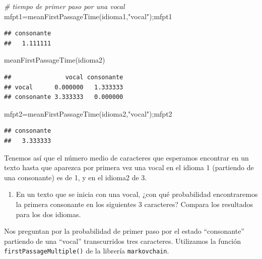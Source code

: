 \documentclass[
]{book}
\newenvironment{Shaded}{\begin{snugshade}}{\end{snugshade}}
\newcommand{\CommentTok}[1]{\textcolor[rgb]{0.56,0.35,0.01}{\textit{#1}}}
\newcommand{\FunctionTok}[1]{\textcolor[rgb]{0.00,0.00,0.00}{#1}}
\newcommand{\NormalTok}[1]{#1}
\newcommand{\OtherTok}[1]{\textcolor[rgb]{0.56,0.35,0.01}{#1}}
\newcommand{\StringTok}[1]{\textcolor[rgb]{0.31,0.60,0.02}{#1}}
\providecommand{\tightlist}{%
  \setlength{\itemsep}{0pt}\setlength{\parskip}{0pt}}
\theoremstyle{definition}
\theoremstyle{definition}
\theoremstyle{definition}
\theoremstyle{definition}
\theoremstyle{remark}
\begin{document}
\begin{Shaded}
\begin{Highlighting}[]
\CommentTok{\# tiempo de primer paso por una vocal}
\NormalTok{mfpt1}\OtherTok{=}\FunctionTok{meanFirstPassageTime}\NormalTok{(idioma1,}\StringTok{"vocal"}\NormalTok{);mfpt1}
\end{Highlighting}
\end{Shaded}

\begin{verbatim}
## consonante 
##   1.111111
\end{verbatim}

\begin{Shaded}
\begin{Highlighting}[]
\FunctionTok{meanFirstPassageTime}\NormalTok{(idioma2)}
\end{Highlighting}
\end{Shaded}

\begin{verbatim}
##               vocal consonante
## vocal      0.000000   1.333333
## consonante 3.333333   0.000000
\end{verbatim}

\begin{Shaded}
\begin{Highlighting}[]
\NormalTok{mfpt2}\OtherTok{=}\FunctionTok{meanFirstPassageTime}\NormalTok{(idioma2,}\StringTok{"vocal"}\NormalTok{);mfpt2}
\end{Highlighting}
\end{Shaded}

\begin{verbatim}
## consonante 
##   3.333333
\end{verbatim}

Tenemos así que el número medio de caracteres que esperamos encontrar en un texto hasta que aparezca por primera vez una vocal en el idioma 1 (partiendo de una consonante) es de 1, y en el idioma2 de 3.

\begin{enumerate}
\def\labelenumi{\arabic{enumi}.}
\setcounter{enumi}{4}
\tightlist
\item
  En un texto que se inicia con una vocal, ¿con qué probabilidad encontraremos la primera consonante en los siguientes 3 caracteres? Compara los resultados para los dos idiomas.
\end{enumerate}

Nos preguntan por la probabilidad de primer paso por el estado ``consonante'' partiendo de una ``vocal'' transcurridos tres caracteres. Utilizamos la función \texttt{firstPassageMultiple()} de la librería \texttt{markovchain}.
\end{document}
